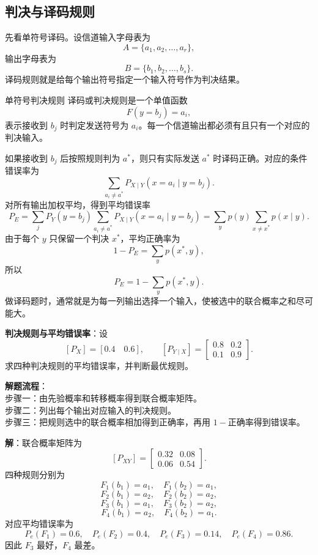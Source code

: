 \subsection{判决与译码规则}

先看单符号译码。设信道输入字母表为
\[
A=\{a_1,a_2,\dots,a_r\},
\]
输出字母表为
\[
B=\{b_1,b_2,\dots,b_s\}.
\]
译码规则就是给每个输出符号指定一个输入符号作为判决结果。

\begin{definitionBox}{单符号判决规则}
译码或判决规则是一个单值函数
\[
F(y=b_j)=a_i,
\]
表示接收到 $b_j$ 时判定发送符号为 $a_i$。每一个信道输出都必须有且只有一个对应的判决输入。
\end{definitionBox}

如果接收到 $b_j$ 后按照规则判为 $a^*$，则只有实际发送 $a^*$ 时译码正确。对应的条件错误率为
\[
\sum_{a_i\ne a^*}P_{X\mid Y}(x=a_i\mid y=b_j).
\]
对所有输出加权平均，得到平均错误率
\[
P_E=\sum_j P_Y(y=b_j)\sum_{a_i\ne a^*}P_{X\mid Y}(x=a_i\mid y=b_j)
=\sum_y p(y)\sum_{x\ne x^*}p(x\mid y).
\]
由于每个 $y$ 只保留一个判决 $x^*$，平均正确率为
\[
1-P_E=\sum_y p(x^*,y),
\]
所以
\[
P_E=1-\sum_y p(x^*,y).
\]
做译码题时，通常就是为每一列输出选择一个输入，使被选中的联合概率之和尽可能大。

\begin{example}
\label{ex:ch7-decision-rule-error-rate}
\textbf{判决规则与平均错误率}：设
\[
[P_X]=[0.4\quad 0.6],
\qquad
[P_{Y\mid X}]=
\begin{bmatrix}
0.8&0.2\\
0.1&0.9
\end{bmatrix}.
\]
求四种判决规则的平均错误率，并判断最优规则。

\noindent \textbf{解题流程}：\\[2pt]
步骤一：由先验概率和转移概率得到联合概率矩阵。\\
步骤二：列出每个输出对应输入的判决规则。\\
步骤三：把规则选中的联合概率相加得到正确率，再用 $1-$正确率得到错误率。

\textbf{解}：联合概率矩阵为
\[
[P_{XY}]=
\begin{bmatrix}
0.32&0.08\\
0.06&0.54
\end{bmatrix}.
\]
四种规则分别为
\[
F_1(b_1)=a_1,\quad F_1(b_2)=a_1,
\]
\[
F_2(b_1)=a_2,\quad F_2(b_2)=a_2,
\]
\[
F_3(b_1)=a_1,\quad F_3(b_2)=a_2,
\]
\[
F_4(b_1)=a_2,\quad F_4(b_2)=a_1.
\]
对应平均错误率为
\[
P_e(F_1)=0.6,
\quad
P_e(F_2)=0.4,
\quad
P_e(F_3)=0.14,
\quad
P_e(F_4)=0.86.
\]
因此 $F_3$ 最好，$F_4$ 最差。
\end{example}

